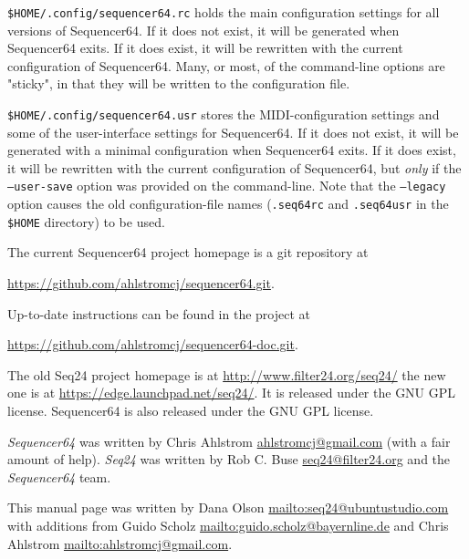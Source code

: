    \texttt{\$HOME/.config/sequencer64.rc} holds the main configuration settings
   for all versions of Sequencer64.  If it does not exist, it will be generated
   when Sequencer64 exits.  If it does exist, it will be rewritten with the
   current configuration of Sequencer64.  Many, or most, of the command-line
   options are "sticky", in that they will be written to the configuration
   file.

   \texttt{\$HOME/.config/sequencer64.usr} stores the MIDI-configuration
   settings and some of the user-interface settings for Sequencer64.  If it
   does not exist, it will be generated with a minimal configuration when
   Sequencer64 exits.  If it does exist, it will be rewritten with the current
   configuration of Sequencer64, but \textsl{only} if the
   \texttt{--user-save} option was provided on the command-line.
   Note that the
   \texttt{--legacy} option causes the old
   configuration-file names (\texttt{.seq64rc} and \texttt{.seq64usr}
   in the \texttt{\$HOME} directory)
   to be used.

   The current Sequencer64 project homepage is a git repository at

   \url{https://github.com/ahlstromcj/sequencer64.git}.

   Up-to-date instructions can be found in the project at

   \url{https://github.com/ahlstromcj/sequencer64-doc.git}.

   The old Seq24 project homepage is at
   \url{http://www.filter24.org/seq24/} the new
   one is at \url{https://edge.launchpad.net/seq24/}.
   It is released under the GNU GPL license.
   Sequencer64 is also released under the GNU GPL license.

   \textsl{Sequencer64} was written by Chris Ahlstrom
   \href{mailto:ahlstromcj@gmail.com}{ahlstromcj@gmail.com}
   (with a fair amount of help).
   \textsl{Seq24} was written by Rob C. Buse
   \href{mailto:seq24@filter24.org}{seq24@filter24.org}
   and the \textsl{Sequencer64} team.

   This manual page was written by Dana Olson
   \url{mailto:seq24@ubuntustudio.com} with additions from Guido Scholz
   \url{mailto:guido.scholz@bayernline.de} and Chris Ahlstrom
   \url{mailto:ahlstromcj@gmail.com}.


